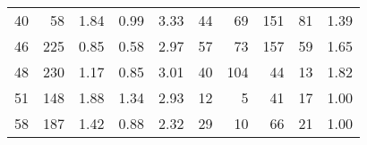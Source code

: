\begin{tabular}{rrrrrrrrrr}
40 &       58 &           1.84 &           0.99 &          3.33 &              44 &              69 &                   151 &                       81 &       1.39 \\
46 &      225 &           0.85 &           0.58 &          2.97 &              57 &              73 &                   157 &                       59 &       1.65 \\
48 &      230 &           1.17 &           0.85 &          3.01 &              40 &             104 &                    44 &                       13 &       1.82 \\
51 &      148 &           1.88 &           1.34 &          2.93 &              12 &               5 &                    41 &                       17 &       1.00 \\
58 &      187 &           1.42 &           0.88 &          2.32 &              29 &              10 &                    66 &                       21 &       1.00 \\
\bottomrule
\end{tabular}
